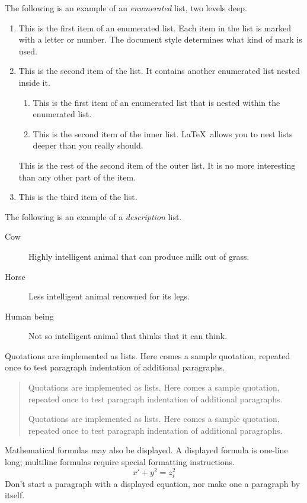 \documentclass{river-journal}
\begin{document}
The following is an example of an {\em enumerated} list, two levels deep.
\begin{enumerate}
\item  This is the first item of an enumerated list.  Each item
      in the list is marked with a letter or number.  The document
      style determines what kind of mark is used.
\item  This is the second item of the list.  It contains another
      enumerated list nested inside it.
    \begin{enumerate}
       \item This is the first item of an enumerated list that
            is nested within the enumerated list.
          \item This is the second item of the inner list.  \LaTeX\
            allows you to nest lists deeper than you really should.
      \end{enumerate}
      This is the rest of the second item of the outer list.  It
      is no more interesting than any other part of the item.
   \item  This is the third item of the list.
\end{enumerate}


The following is an example of a {\em description} list.
\begin{description}
\item[Cow] Highly intelligent animal that can produce milk out of grass.
\item[Horse] Less intelligent animal renowned for its legs.
\item[Human being] Not so intelligent animal that thinks that it can think.
\end{description}

Quotations are implemented as lists. Here comes a sample quotation,
repeated once to test paragraph indentation of additional
paragraphs.
\begin{quotation}
Quotations are implemented as lists. Here comes a sample quotation,
repeated once to test paragraph indentation of additional paragraphs.

Quotations are implemented as lists. Here comes a sample quotation,
repeated once to test paragraph indentation of additional paragraphs.
\end{quotation}

Mathematical formulas may also be displayed.  A displayed formula is
one-line long; multiline formulas require special formatting
instructions.
   \[  x' + y^{2} = z_{i}^{2}\]
Don't start a paragraph with a displayed equation, nor make
one a paragraph by itself.
\end{document}
